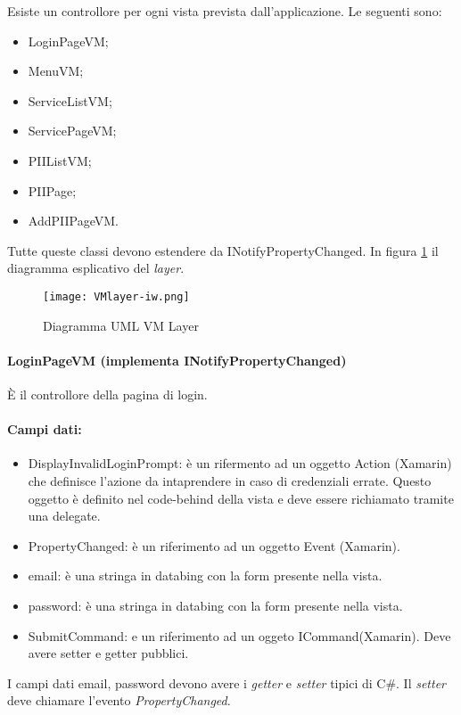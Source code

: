 Esiste un controllore per ogni vista prevista dall’applicazione. Le seguenti sono:
\begin{itemize}
    \item LoginPageVM;
    \item MenuVM;
    \item ServiceListVM;
    \item ServicePageVM;
    \item PIIListVM;
    \item PIIPage;
    \item AddPIIPageVM.
\end{itemize}
Tutte queste classi devono estendere da INotifyPropertyChanged.
In figura \ref{fig:vm-layer-iw} il diagramma esplicativo del \emph{layer}.

\begin{figure}[htbp]
    \centering
    \texttt{[image: VMlayer-iw.png]} 
    \caption{Diagramma UML VM Layer}
    \label{fig:vm-layer-iw} 
\end{figure}

\paragraph{LoginPageVM (implementa INotifyPropertyChanged)}
È il controllore della pagina di login.
\paragraph{Campi dati:}
\begin{itemize}
    \item DisplayInvalidLoginPrompt: è un rifermento ad un oggetto Action (Xamarin) che definisce l’azione da intaprendere in caso di credenziali errate. Questo oggetto è definito nel code-behind della vista e deve essere richiamato tramite una delegate.
    \item PropertyChanged: è un riferimento ad un oggetto Event (Xamarin).
    \item email: è una stringa in databing con la form presente nella vista. 
    \item password: è una stringa in databing con la form presente nella vista.
    \item SubmitCommand: e un riferimento ad un oggeto ICommand(Xamarin). Deve avere setter e getter pubblici.
\end{itemize}

I campi dati email, password devono avere i \emph{getter} e \emph{setter} tipici di C\#. Il \emph{setter} deve chiamare l’evento \emph{PropertyChanged}.

